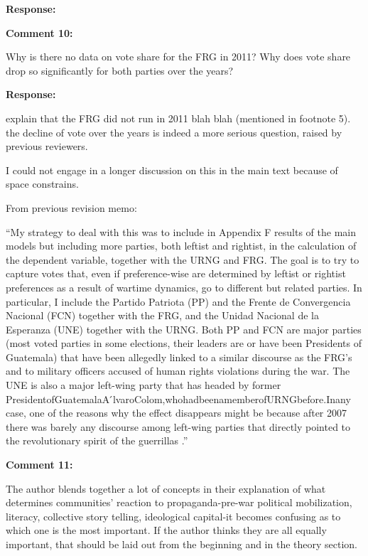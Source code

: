 \documentclass[12pt, a4paper, notitlepage]{article}
\begin{document}
\noindent\textbf{Response:}



\vspace{15pt}
\noindent\textbf{Comment 10:}
\begin{displayquote}
Why is there no data on vote share for the FRG in 2011? Why does vote share drop so significantly for both parties over the years?
\end{displayquote}

\noindent\textbf{Response:}

explain that the FRG did not run in 2011 blah blah (mentioned in footnote 5).
the decline of vote over the years is indeed a more serious question, raised by previous reviewers.

I could not engage in a longer discussion on this in the main text because of space constrains.

From previous revision memo:

``My strategy to deal with this was to include in Appendix F results of the main models but including more parties, both leftist and rightist, in the calculation of the dependent variable, together with the URNG and FRG. The goal is to try to capture votes that, even if preference-wise are determined by leftist or rightist preferences as a result of wartime dynamics, go to different but related parties. In particular, I include the Partido Patriota (PP) and the Frente de Convergencia Nacional (FCN) together with the FRG, and the Unidad Nacional de la Esperanza (UNE) together with the URNG. Both PP and FCN are major parties (most voted parties in some elections, their leaders are or have been Presidents of Guatemala) that have been allegedly linked to a similar discourse as the FRG’s and to military officers accused of human rights violations during the war. The UNE is also a major left-wing party that has headed by former PresidentofGuatemalaA ́lvaroColom,whohadbeenamemberofURNGbefore.Inany case, one of the reasons why the effect disappears might be because after 2007 there was barely any discourse among left-wing parties that directly pointed to the revolutionary spirit of the guerrillas \citep{Ibarra:2008to}.''

\vspace{15pt}
\noindent\textbf{Comment 11:}
\begin{displayquote}
The author blends together a lot of concepts in their explanation of what determines communities' reaction to propaganda-pre-war political mobilization, literacy, collective story telling, ideological capital-it becomes confusing as to which one is the most important. If the author thinks they are all equally important, that should be laid out from the beginning and in the theory section.
\end{displayquote}
\end{document}
